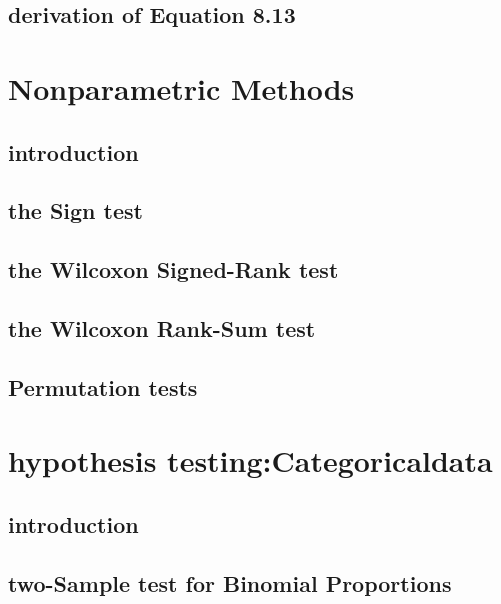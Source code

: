 \documentclass[12pt,]{article}
\theoremstyle{definition}
\theoremstyle{definition}
\theoremstyle{definition}
\theoremstyle{remark}
\begin{document}
\subsection{derivation of Equation
8.13}\label{derivation-of-equation-8.13}

\section{Nonparametric Methods}\label{nonparametric-methods}

\subsection{introduction}\label{introduction-7}

\subsection{the Sign test}\label{the-sign-test}

\subsection{the Wilcoxon Signed-Rank
test}\label{the-wilcoxon-signed-rank-test}

\subsection{the Wilcoxon Rank-Sum
test}\label{the-wilcoxon-rank-sum-test}

\subsection{Permutation tests}\label{permutation-tests}

\section{hypothesis
testing:Categoricaldata}\label{hypothesis-testingcategoricaldata}

\subsection{introduction}\label{introduction-8}

\subsection{two-Sample test for Binomial
Proportions}\label{two-sample-test-for-binomial-proportions}
\end{document}
